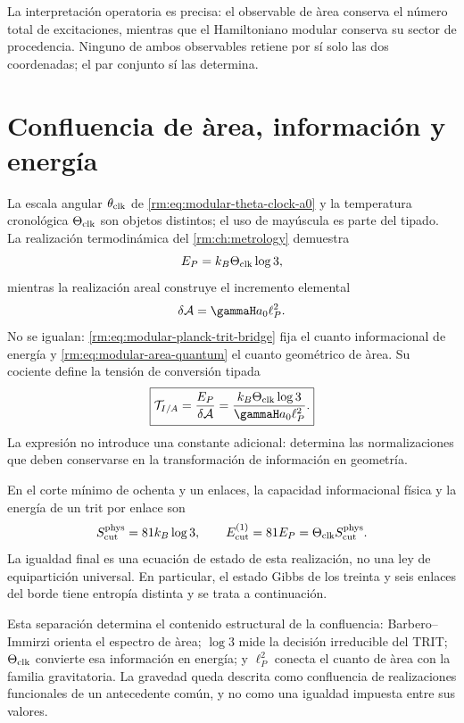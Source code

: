 La interpretaci\'on operatoria es precisa: el observable de \`area conserva
el n\'umero total de excitaciones, mientras que el Hamiltoniano modular
conserva su sector de procedencia. Ninguno de ambos observables retiene por
s\'i solo las dos coordenadas; el par conjunto s\'i las determina.

\section{Confluencia de \`area, informaci\'on y energ\'ia}

La escala angular \(\theta_{\rm clk}\) de
\cref{rm:eq:modular-theta-clock-a0} y la temperatura cronol\'ogica
\(\Theta_{\rm clk}\) son objetos distintos; el uso de may\'uscula es parte
del tipado. La realizaci\'on termodin\'amica del \cref{rm:ch:metrology} demuestra
\begin{equation}
\label{rm:eq:modular-planck-trit-bridge}
E_P=k_B\Theta_{\rm clk}\log3,
\end{equation}
mientras la realizaci\'on areal construye el incremento elemental
\begin{equation}
\label{rm:eq:modular-area-quantum}
\delta\mathcal A
=\gammaH a_0\ell_P^2.
\end{equation}
No se igualan: \cref{rm:eq:modular-planck-trit-bridge} fija el cuanto
informacional de energ\'ia y \cref{rm:eq:modular-area-quantum} el cuanto
geom\'etrico de \`area. Su cociente define la tensi\'on de conversi\'on
tipada
\begin{equation}
\label{rm:eq:modular-information-area-tension}
\boxed{
\mathcal T_{I/A}
=\frac{E_P}{\delta\mathcal A}
=\frac{k_B\Theta_{\rm clk}\log3}
{\gammaH a_0\ell_P^2}.}
\end{equation}
La expresi\'on no introduce una constante adicional: determina las
normalizaciones que deben conservarse en la transformaci\'on de informaci\'on
en geometr\'ia.


En el corte m\'inimo de ochenta y un enlaces, la capacidad informacional
f\'isica y la energ\'ia de un trit por enlace son
\begin{equation}
\label{rm:eq:modular-cut-info-energy}
S_{\rm cut}^{\rm phys}=81k_B\log3,
\qquad
E_{\rm cut}^{(1)}=81E_P
=\Theta_{\rm clk}S_{\rm cut}^{\rm phys}.
\end{equation}
La igualdad final es una ecuaci\'on de estado de esta realizaci\'on, no una ley de
equipartici\'on universal. En particular, el estado Gibbs de los treinta y
seis enlaces del borde tiene entrop\'ia distinta y se trata a continuaci\'on.

Esta separaci\'on determina el contenido estructural de la confluencia:
Barbero--Immirzi
orienta el espectro de \`area; \(\log3\) mide la decisi\'on irreducible del
TRIT; \(\Theta_{\rm clk}\) convierte esa informaci\'on en energ\'ia; y
\(\ell_P^2\) conecta el cuanto de \`area con la familia gravitatoria. La
gravedad queda descrita como confluencia de realizaciones funcionales de un
antecedente com\'un, y no como una igualdad impuesta entre sus valores.
